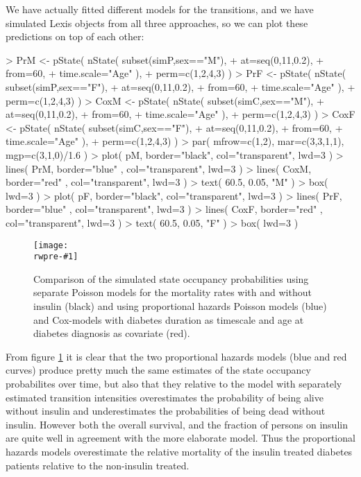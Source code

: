 \documentclass[a4paper,twoside,12pt]{report}
\newcommand{\rwpre}{sL}
\newcommand{\insfig}[3]{
\begin{figure}[h]
  \centering
  \texttt{[image: \\rwpre-\#1]}
  \caption{#3}
  \label{fig:#1}
\end{figure}}
\begin{document}
We have actually fitted different models for the transitions, and we
have simulated Lexis objects from all three approaches, so we can plot
these predictions on top of each other:
\begin{Schunk}
\begin{Sinput}
> PrM  <- pState( nState( subset(simP,sex=="M"),
+                         at=seq(0,11,0.2),
+                         from=60,
+                         time.scale="Age" ),
+                 perm=c(1,2,4,3) )
> PrF  <- pState( nState( subset(simP,sex=="F"),
+                         at=seq(0,11,0.2),
+                         from=60,
+                         time.scale="Age" ),
+                 perm=c(1,2,4,3) )
> CoxM <- pState( nState( subset(simC,sex=="M"),
+                         at=seq(0,11,0.2),
+                         from=60,
+                         time.scale="Age" ),
+                 perm=c(1,2,4,3) )
> CoxF <- pState( nState( subset(simC,sex=="F"),
+                         at=seq(0,11,0.2),
+                         from=60,
+                         time.scale="Age" ),
+                 perm=c(1,2,4,3) )
> par( mfrow=c(1,2), mar=c(3,3,1,1), mgp=c(3,1,0)/1.6 )
>  plot(   pM, border="black", col="transparent", lwd=3 )
> lines(  PrM, border="blue" , col="transparent", lwd=3 )
> lines( CoxM, border="red"  , col="transparent", lwd=3 )
> text( 60.5, 0.05, "M" )
> box( lwd=3 )
>  plot(   pF, border="black", col="transparent", lwd=3 )
> lines(  PrF, border="blue" , col="transparent", lwd=3 )
> lines( CoxF, border="red"  , col="transparent", lwd=3 )
> text( 60.5, 0.05, "F" )
> box( lwd=3 )
\end{Sinput}
\end{Schunk}
\insfig{comp-0}{1.0}{Comparison of the simulated state occupancy
  probabilities using separate Poisson models for the mortality rates
  with and without insulin (black) and using proportional hazards
  Poisson models (blue) and Cox-models with diabetes duration as
  timescale and age at diabetes diagnosis as covariate (red).}

From figure \ref{fig:comp-0} it is clear that the two proportional
hazards models (blue and red curves) produce pretty much the same
estimates of the state occupancy probabilites over time, but also that
they relative to the model with separately estimated transition
intensities overestimates the probability of being alive without
insulin and underestimates the probabilities of being dead without
insulin. However both the overall survival, and the fraction of
persons on insulin are quite well in agreement with the more elaborate
model. Thus the proportional hazards models overestimate the relative
mortality of the insulin treated diabetes patients relative to the
non-insulin treated.
\end{document}
